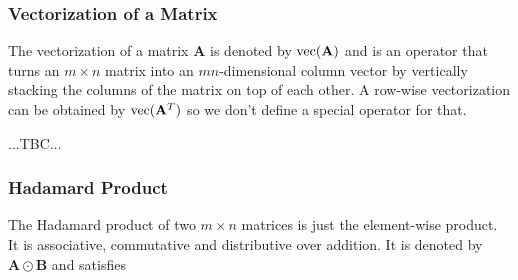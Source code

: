 \subsubsection{Vectorization of a Matrix}
The vectorization of a matrix $\mathbf{A}$ is denoted by $\operatorname{vec}(\mathbf{A})$ and is an operator that turns an $m \times n$ matrix into an $mn$-dimensional column vector by vertically stacking the columns of the matrix on top of each other. A row-wise vectorization can be obtained by $\operatorname{vec}(\mathbf{A}^T)$ so we don't define a special operator for that. 



...TBC...








\subsubsection{Hadamard Product} The Hadamard product of two $m \times n$ matrices is just the element-wise product. It is associative, commutative and distributive over addition. It is denoted by $\mathbf{A} \odot \mathbf{B}$ and satisfies

